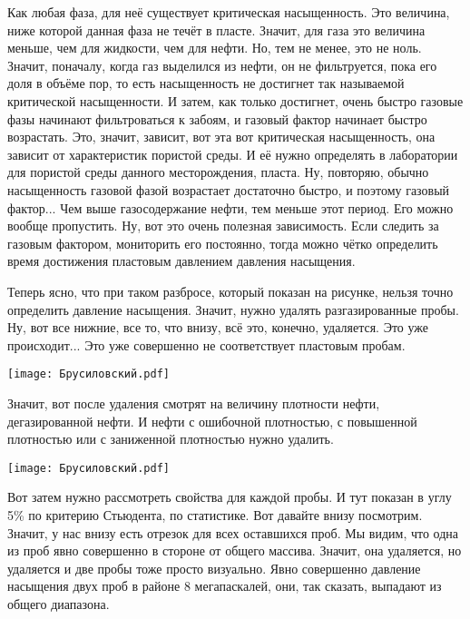 \documentclass[main.tex]{subfiles}
\begin{document}
Как любая фаза, для неё существует критическая насыщенность.
Это величина, ниже которой данная фаза не течёт в пласте.
Значит, для газа это величина меньше, чем для жидкости, чем для нефти.
Но, тем не менее, это не ноль.
Значит, поначалу, когда газ выделился из нефти, он не фильтруется, пока его доля в объёме пор, то есть насыщенность не достигнет так называемой критической насыщенности.
И затем, как только достигнет, очень быстро газовые фазы начинают фильтроваться к забоям, и газовый фактор начинает быстро возрастать.
Это, значит, зависит, вот эта вот критическая насыщенность, она зависит от характеристик пористой среды.
И её нужно определять в лаборатории для пористой среды данного месторождения, пласта.
Ну, повторяю, обычно насыщенность газовой фазой возрастает достаточно быстро, и поэтому газовый фактор...
Чем выше газосодержание нефти, тем меньше этот период.
Его можно вообще пропустить.
Ну, вот это очень полезная зависимость.
Если следить за газовым фактором, мониторить его постоянно, тогда можно чётко определить время достижения пластовым давлением давления насыщения.

Теперь ясно, что при таком разбросе, который показан на рисунке, нельзя точно определить давление насыщения.
Значит, нужно удалять разгазированные пробы.
Ну, вот все нижние, все то, что внизу, всё это, конечно, удаляется.
Это уже происходит...
Это уже совершенно не соответствует пластовым пробам.

\begin{center}
\texttt{[image: Брусиловский.pdf]}
\end{center}

Значит, вот после удаления смотрят на величину плотности нефти, дегазированной нефти.
И нефти с ошибочной плотностью, с повышенной плотностью или с заниженной плотностью нужно удалить.

\begin{center}
\texttt{[image: Брусиловский.pdf]}
\end{center}

Вот затем нужно рассмотреть свойства для каждой пробы.
И тут показан в углу 5\% по критерию Стьюдента, по статистике.
Вот давайте внизу посмотрим.
Значит, у нас внизу есть отрезок для всех оставшихся проб.
Мы видим, что одна из проб явно совершенно в стороне от общего массива.
Значит, она удаляется, но удаляется и две пробы тоже просто визуально.
Явно совершенно давление насыщения двух проб в районе 8 мегапаскалей, они, так сказать, выпадают из общего диапазона.
\end{document}
